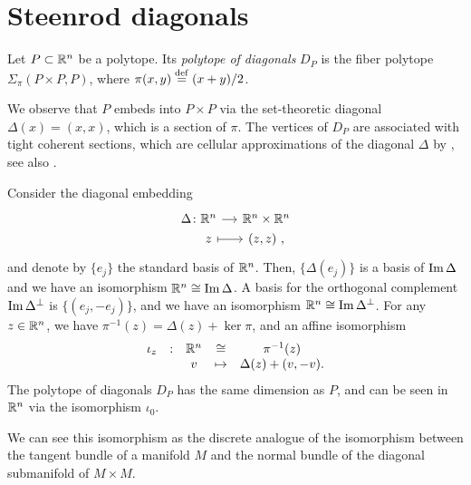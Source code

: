 
\section{Steenrod diagonals}

\begin{definition}
	Let $P\subset \mathbb{R}^n$ be a polytope.
	Its \emph{polytope of diagonals} $D_P$ is the fiber polytope $\Sigma_\pi(P\times P, P)$, where $\pi(x,y)\stackrel{\mathrm{def}}{=} (x+y)/2$.
\end{definition}

We observe that $P$ embeds into $P\times P$ via the set-theoretic diagonal $\Delta (x)=(x,x)$, which is a section of $\pi$.
The vertices of $D_P$ are associated with tight coherent sections, which are cellular approximations of the diagonal $\Delta$ by \cite[Proposition 5]{MTTV19}, see also \cite[Proposition 1.1]{GLA21}.

 

Consider the diagonal embedding
\[
\begin{tikzcd}[row sep=0, column sep=small]
	\Delta \colon \R^n \arrow{r} & \R^n \times \R^n \\
	\phantom{\Delta \colon} z \arrow[r, |->] & (z,z) \ ,
\end{tikzcd}
\]
and denote by $\{e_j\}$ the standard basis of $\mathbb{R}^n$.
Then, $\{\Delta (e_j)\}$ is a basis of $\operatorname{\mathrm{Im}} \Delta$ and we have an isomorphism $\mathbb{R}^n \cong \operatorname{\mathrm{Im}} \Delta$.
A basis for the orthogonal complement $\operatorname{\mathrm{Im}} \Delta^{\bot}$ is $\{(e_j,-e_j)\}$, and we have an isomorphism $\mathbb{R}^n \cong \operatorname{\mathrm{Im}} \Delta^{\bot}$.
For any $z \in \mathbb{R}^n$, we have $\pi^{-1}(z)=\Delta(z)+\ker \pi$, and an affine isomorphism
\begin{equation} \label{eq:D_P-iso}
	\begin{matrix}
		\iota_z & : & \mathbb{R}^n  & \cong & \pi^{-1}(z) \\
		& & v  & \mapsto & \Delta(z)+(v,-v).
	\end{matrix}
\end{equation}
The polytope of diagonals $D_P$ has the same dimension as $P$, and can be seen in $\mathbb{R}^n$ via the isomorphism $\iota_0$.

\begin{remark}
	We can see this isomorphism as the discrete analogue of the isomorphism between the tangent bundle of a manifold $M$ and the normal bundle of the diagonal submanifold of $M\times M$.
\end{remark}

